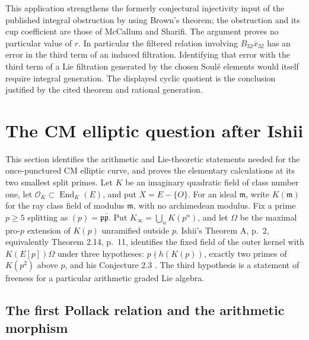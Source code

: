 \documentclass[11pt]{article}
\theoremstyle{definition}\newtheorem{definition}[theorem]{Definition}
\begin{document}
This application strengthens the formerly conjectural
injectivity input of the published integral obstruction
by using Brown's theorem; the obstruction and its cup
coefficient are those of McCallum and Sharifi.
The argument proves no particular value of $r$.
In particular the filtered relation involving
$B_{32}\bar x_{32}$ has an error in the third term of an
induced filtration. Identifying that error with the
third term of a Lie filtration generated by the chosen
Soul\'e elements would itself require integral generation.
The displayed cyclic quotient is the conclusion justified
by the cited theorem and rational generation.

\section{The CM elliptic question after Ishii}
\label{sec:cm-audit}

This section identifies the arithmetic and Lie-theoretic statements
needed for the once-punctured CM elliptic curve, and proves the elementary
calculations at its two smallest split primes.
Let \(K\) be an imaginary quadratic field of class number one, let
\(\mathcal O_K\subset\operatorname{End}_K(E)\), and put \(X=E-\{O\}\).
For an ideal \(\mathfrak m\), write \(K(\mathfrak m)\) for the ray class
field of modulus \(\mathfrak m\), with no archimedean modulus. Fix a prime
\(p\geq5\) splitting as \((p)=\mathfrak p\bar{\mathfrak p}\).
Put \(K_\infty=\bigcup_nK(p^n)\), and let \(\Omega\) be the maximal
pro-\(p\) extension of \(K(p)\) unramified outside \(p\).
Ishii's Theorem A, p.~2, equivalently Theorem 2.14, p.~11,
identifies the fixed field of the outer kernel with \(K(E[p])\Omega\)
under three hypotheses: \(p\nmid h(K(p))\), exactly two primes of
\(K(p^2)\) above \(p\), and his Conjecture 2.3
\cite{Ishii}. The third hypothesis is a statement of freeness
for a particular arithmetic graded Lie algebra.

\subsection{The first Pollack relation and the arithmetic morphism}
\end{document}
